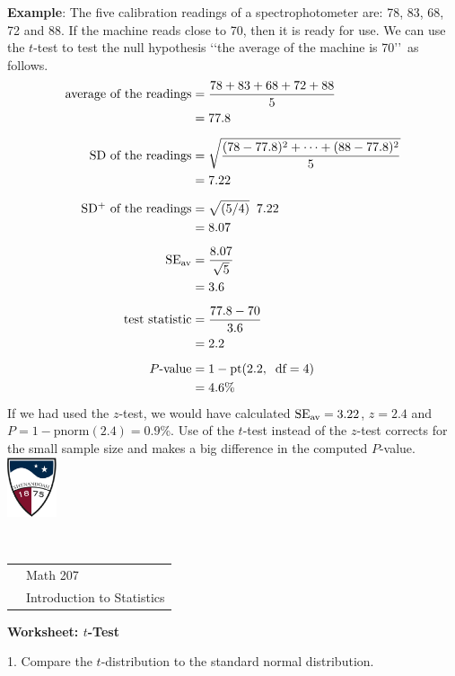 \documentclass[10pt]{article}
\begin{document}
\textbf{Example}:
The five calibration readings of a spectrophotometer are:
78, 83, 68, 72 and 88.  If the machine reads close to 70, then it is ready for
use.  We can use the $t$-test 
to test the null hypothesis \lq\lq the average of the machine is 70\rq\rq\ as
follows.
\begin{align*}
\mbox{average of the readings} &= \frac{78+83+68+72+88}{5}\\ & = 77.8\\[5pt]
\mbox{SD of the readings}      &=\sqrt{\frac{(78-77.8)^2 + \cdots + (88-77.8)^2}{5}}\\
   &= 7.22\\[5pt]
\mbox{SD$^+$ of the readings}   &=\sqrt{(5/4)}\;\;7.22 \\ &= 8.07\\[5pt]
\mbox{SE}_{\mbox{\scriptsize av}}    &= \frac{8.07}{\sqrt{5}}\\ &= 3.6\\[5pt]
\mbox{test statistic}          &= \frac{77.8-70}{3.6}\\ & = 2.2\\[5pt]
\mbox{$P$-value}               &= 1-\mbox{pt}(2.2,\;\;\mbox{df}=4)\\ &= 4.6\%
\end{align*}
If we had used the $z$-test, we would have calculated
$\mbox{SE}_{\scriptsize\mbox{av}}=3.22$, $z=2.4$ and $P=1-\mbox{pnorm}(2.4)=0.9$\%.
Use of the $t$-test instead of the $z$-test corrects for the small sample size
and makes a big difference in the computed $P$-value.
\vfill
\eject
\href{http://www.su.edu}{\includegraphics[height=1.75cm]{sulogo.eps}}
\vspace{-1.79cm}

{{\ }\hfill\small
\begin{tabular}{cl}
& Math 207\\
& Introduction to Statistics\\
\end{tabular}
}
\medskip

\begin{center}
\textbf{\large  Worksheet:  $t$-Test}
\end{center}
\smallskip

1. Compare the $t$-distribution to the standard normal distribution.
\end{document}
